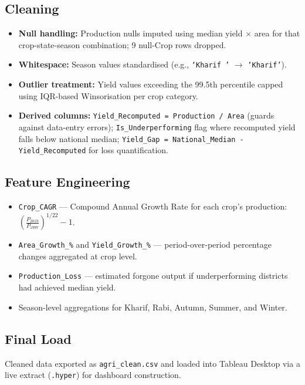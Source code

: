 \documentclass[10pt]{article}
\begin{document}
\subsection{Cleaning}
\begin{itemize}[leftmargin=*, topsep=2pt, itemsep=1pt]
  \item \textbf{Null handling:} Production nulls imputed using median yield
        $\times$ area for that crop-state-season combination; 9 null-Crop rows dropped.
  \item \textbf{Whitespace:} Season values standardised (e.g.,
        \texttt{`Kharif '} $\to$ \texttt{`Kharif'}).
  \item \textbf{Outlier treatment:} Yield values exceeding the 99.5th percentile
        capped using IQR-based Winsorisation per crop category.
  \item \textbf{Derived columns:} \texttt{Yield\_Recomputed = Production / Area}
        (guards against data-entry errors); \texttt{Is\_Underperforming} flag
        where recomputed yield falls below national median; \texttt{Yield\_Gap =
        National\_Median - Yield\_Recomputed} for loss quantification.
\end{itemize}

\subsection{Feature Engineering}
\begin{itemize}[leftmargin=*, topsep=2pt, itemsep=1pt]
  \item \texttt{Crop\_CAGR} — Compound Annual Growth Rate for each crop's
        production: $\left(\frac{P_{2019}}{P_{1997}}\right)^{1/22} - 1$.
  \item \texttt{Area\_Growth\_\%} and \texttt{Yield\_Growth\_\%} — period-over-period
        percentage changes aggregated at crop level.
  \item \texttt{Production\_Loss} — estimated forgone output if underperforming
        districts had achieved median yield.
  \item Season-level aggregations for Kharif, Rabi, Autumn, Summer, and Winter.
\end{itemize}

\subsection{Final Load}
Cleaned data exported as \texttt{agri\_clean.csv} and loaded into Tableau Desktop
via a live extract (\texttt{.hyper}) for dashboard construction.
\end{document}
